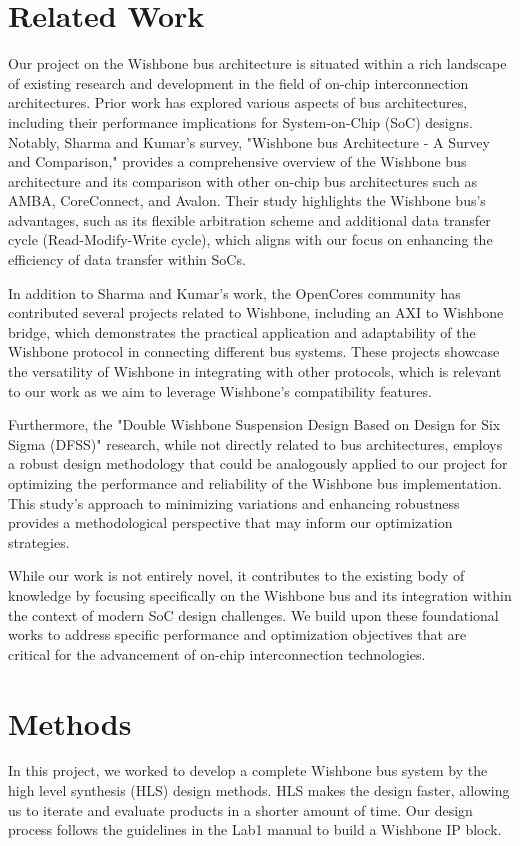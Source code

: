 \documentclass[conference]{IEEEtran}
\begin{document}
\section{Related Work}
Our project on the Wishbone bus architecture is situated within a rich landscape of existing research and development in the field of on-chip interconnection architectures. Prior work has explored various aspects of bus architectures, including their performance implications for System-on-Chip (SoC) designs. Notably, Sharma and Kumar's survey, "Wishbone bus Architecture - A Survey and Comparison," provides a comprehensive overview of the Wishbone bus architecture and its comparison with other on-chip bus architectures such as AMBA, CoreConnect, and Avalon. Their study highlights the Wishbone bus's advantages, such as its flexible arbitration scheme and additional data transfer cycle (Read-Modify-Write cycle)\cite{Sharma_2012}, which aligns with our focus on enhancing the efficiency of data transfer within SoCs.

In addition to Sharma and Kumar's work, the OpenCores community has contributed several projects related to Wishbone, including an AXI to Wishbone bridge, which demonstrates the practical application and adaptability of the Wishbone protocol in connecting different bus systems\cite{opencores_wishbone}. These projects showcase the versatility of Wishbone in integrating with other protocols, which is relevant to our work as we aim to leverage Wishbone's compatibility features.

Furthermore, the "Double Wishbone Suspension Design Based on Design for Six Sigma (DFSS)" research, while not directly related to bus architectures, employs a robust design methodology that could be analogously applied to our project for optimizing the performance and reliability of the Wishbone bus implementation\cite{10.1145/3421766.3421866}. This study's approach to minimizing variations and enhancing robustness provides a methodological perspective that may inform our optimization strategies.


While our work is not entirely novel, it contributes to the existing body of knowledge by focusing specifically on the Wishbone bus and its integration within the context of modern SoC design challenges. We build upon these foundational works to address specific performance and optimization objectives that are critical for the advancement of on-chip interconnection technologies.



\section{Methods}
In this project, we worked to develop a complete Wishbone bus system by the high level synthesis (HLS) design methods. HLS makes the design faster, allowing us to iterate and evaluate products in a shorter amount of time. Our design process follows the guidelines in the Lab1 manual\cite{ECE4810J_FA2024_Lab1} to build a Wishbone IP block.
\end{document}
